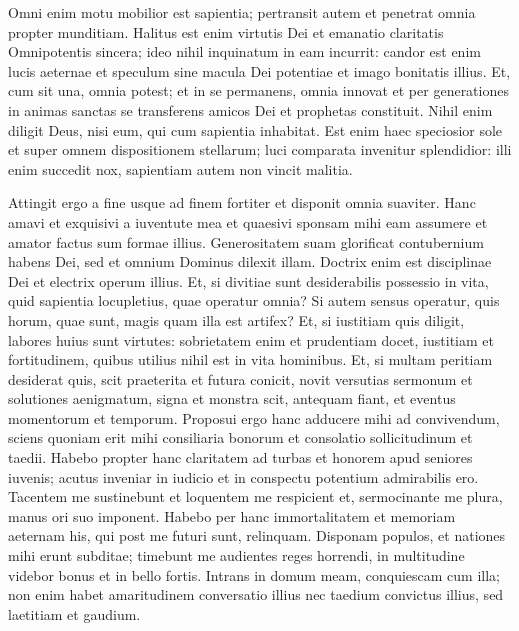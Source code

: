 \begin{biblechapter}
\verse Omni enim motu mobilior est sapientia; pertransit autem et penetrat omnia propter munditiam. 
\verse Halitus est enim virtutis Dei et emanatio claritatis Omnipotentis sincera; ideo nihil inquinatum in eam incurrit: 
\verse candor est enim lucis aeternae et speculum sine macula Dei potentiae et imago bonitatis illius. 
\verse Et, cum sit una, omnia potest; et in se permanens, omnia innovat et per generationes in animas sanctas se transferens amicos Dei et prophetas constituit. 
\verse Nihil enim diligit Deus, nisi eum, qui cum sapientia inhabitat. 
\verse Est enim haec speciosior sole et super omnem dispositionem stellarum; luci comparata invenitur splendidior: 
\verse illi enim succedit nox, sapientiam autem non vincit malitia. 
\end{biblechapter}

\begin{biblechapter}  
\verse Attingit ergo a fine usque ad finem fortiter et disponit omnia suaviter. 
\verse Hanc amavi et exquisivi a iuventute mea et quaesivi sponsam mihi eam assumere et amator factus sum formae illius.  
\verse Generositatem suam glorificat contubernium habens Dei, sed et omnium Dominus dilexit illam. 
\verse Doctrix enim est disciplinae Dei et electrix operum illius. 
\verse Et, si divitiae sunt desiderabilis possessio in vita, quid sapientia locupletius, quae operatur omnia? 
\verse Si autem sensus operatur, quis horum, quae sunt, magis quam illa est artifex? 
\verse Et, si iustitiam quis diligit, labores huius sunt virtutes: sobrietatem enim et prudentiam docet, iustitiam et fortitudinem, quibus utilius nihil est in vita hominibus. 
\verse Et, si multam peritiam desiderat quis, scit praeterita et futura conicit, novit versutias sermonum et solutiones aenigmatum, signa et monstra scit, antequam fiant, et eventus momentorum et temporum. 
\verse Proposui ergo hanc adducere mihi ad convivendum, sciens quoniam erit mihi consiliaria bonorum et consolatio sollicitudinum et taedii. 
\verse Habebo propter hanc claritatem ad turbas et honorem apud seniores iuvenis; 
\verse acutus inveniar in iudicio et in conspectu potentium admirabilis ero. 
\verse Tacentem me sustinebunt et loquentem me respicient et, sermocinante me plura, manus ori suo imponent. 
\verse Habebo per hanc immortalitatem et memoriam aeternam his, qui post me futuri sunt, relinquam. 
\verse Disponam populos, et nationes mihi erunt subditae; 
\verse timebunt me audientes reges horrendi, in multitudine videbor bonus et in bello fortis. 
\verse Intrans in domum meam, conquiescam cum illa; non enim habet amaritudinem conversatio illius nec taedium convictus illius, sed laetitiam et gaudium. 

\end{biblechapter}
